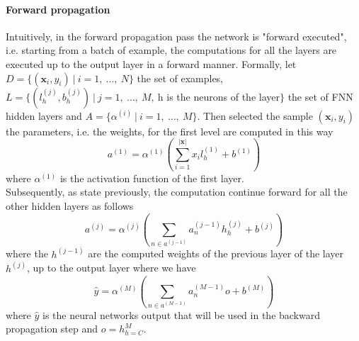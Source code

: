 \paragraph{Forward propagation}
Intuitively, in the forward propagation pass the network is "forward executed", i.e. starting from a batch of example, the computations for all the layers are executed up to the output layer in a forward manner. Formally, let $D = \{(\textbf{x}_{i}, y_{i})\ |\ i=1,\ \dots ,\ N \}$ the set of examples, $L = \{(l^{(j)}_{h}, b^{(j)}_{h})\ |\ j = 1,\ \dots,\ M,\ $h is the neurons of the layer$\}$ the set of FNN hidden layers and $A = \{\alpha^{(i)}\ |\ i = 1,\ \dots,\ M\}$. Then selected the sample $(\textbf{x}_i, y_i)$ the parameters, i.e. the weights, for the first level are computed in this way
\begin{equation}
	a^{(1)} = \alpha^{(1)}(\sum\limits_{i=1}^{|\textbf{x}|}x_{i}l_{h}^{(1)} + b^{(1)})
\end{equation}
where $\alpha^{(1)}$ is the activation function of the first layer.\\
Subsequently, as state previously, the computation continue forward for all the other hidden layers as follows
\begin{equation}
	a^{(j)} = \alpha^{(j)}(\sum\limits_{n \in a^{(j - 1)}}a^{(j - 1)}_{n}h^{(j)}_{h} + b^{(j)})
\end{equation}
where the $h^{(j - 1)}$ are the computed weights of the previous layer of the layer $h^{(j)}$, up to the output layer where we have
\begin{equation}
	\hat{y} = \alpha^{(M)}(\sum\limits_{n \in a^{(M - 1)}}a^{(M - 1)}_{n}o + b^{(M)})	
\end{equation}
where $\hat{y}$ is the neural networks output that will be used in the backward propagation step and $o = h^{M}_{h = C}$.

